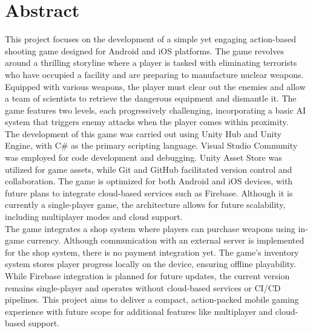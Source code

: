 {\centering\section*{Abstract}}
This project focuses on the development of a simple yet engaging action-based shooting game designed for Android and iOS platforms. The game revolves around a thrilling storyline where a player is tasked with eliminating terrorists who have occupied a facility and are preparing to manufacture nuclear weapons. Equipped with various weapons, the player must clear out the enemies and allow a team of scientists to retrieve the dangerous equipment and dismantle it. The game features two levels, each progressively challenging, incorporating a basic AI system that triggers enemy attacks when the player comes within proximity.\\

The development of this game was carried out using Unity Hub and Unity Engine, with C\# as the primary scripting language. Visual Studio Community was employed for code development and debugging. Unity Asset Store was utilized for game assets, while Git and GitHub facilitated version control and collaboration. The game is optimized for both Android and iOS devices, with future plans to integrate cloud-based services such as Firebase. Although it is currently a single-player game, the architecture allows for future scalability, including multiplayer modes and cloud support.\\

The game integrates a shop system where players can purchase weapons using in-game currency. Although communication with an external server is implemented for the shop system, there is no payment integration yet. The game’s inventory system stores player progress locally on the device, ensuring offline playability. While Firebase integration is planned for future updates, the current version remains single-player and operates without cloud-based services or CI/CD pipelines. This project aims to deliver a compact, action-packed mobile gaming experience with future scope for additional features like multiplayer and cloud-based support.